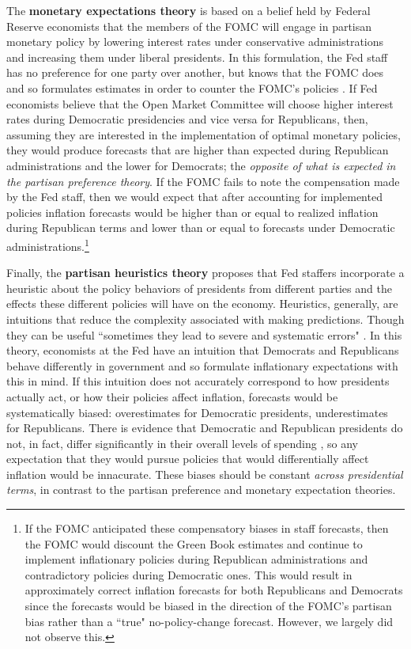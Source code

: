 \documentclass[a4paper]{article}
\begin{document}
The {\bf{monetary expectations theory}} is based on a belief held by Federal Reserve economists that the members of the FOMC will engage in partisan monetary policy by lowering interest rates under conservative administrations and increasing them under liberal presidents. In this formulation, the Fed staff has no preference for one party over another, but knows that the FOMC does and so formulates estimates in order to counter the FOMC's policies \citep{Clark2012}. If Fed economists believe that the Open Market Committee will choose higher interest rates during Democratic presidencies and vice versa for Republicans, then, assuming they are interested in the implementation of optimal monetary policies, they would produce forecasts that are higher than expected during Republican administrations and the lower for Democrats; the {\emph{opposite of what is expected in the partisan preference theory}}. If the FOMC fails to note the compensation made by the Fed staff, then we would expect that after accounting for implemented policies inflation forecasts would be higher than or equal to realized inflation during Republican terms and lower than or equal to forecasts under Democratic administrations.\footnote{If the FOMC anticipated these compensatory biases in staff forecasts, then the FOMC would discount the Green Book estimates and continue to implement inflationary policies during Republican administrations and contradictory policies during Democratic ones. This would result in approximately correct inflation forecasts for both Republicans and Democrats since the forecasts would be biased in the direction of the FOMC's partisan bias rather than a ``true" no-policy-change forecast. However, we largely did not observe this.} %
 
Finally, the {\bf{partisan heuristics theory}} proposes that Fed staffers incorporate a heuristic \citep[see][]{kahneman1973, tverskykahneman1974, kahneman2003} about the policy behaviors of presidents from different parties and the effects these different policies will have on the economy. Heuristics, generally, are intuitions that reduce the complexity associated with making predictions. Though they can be useful ``sometimes they lead to severe and systematic errors" \citep[][1124]{tverskykahneman1974}. In this theory, economists at the Fed have an intuition that Democrats and Republicans behave differently in government and so formulate inflationary expectations with this in mind. If this intuition does not accurately correspond to how presidents actually act, or how their policies affect inflation, forecasts would be systematically biased: overestimates for Democratic presidents, underestimates for Republicans. There is evidence that Democratic and Republican presidents do not, in fact, differ significantly in their overall levels of spending \citep{Bartels2008}, so any expectation that they would pursue policies that would differentially affect inflation would be innacurate. These biases should be constant {\emph{across presidential terms}}, in contrast to the partisan preference and monetary expectation theories.
\end{document}
